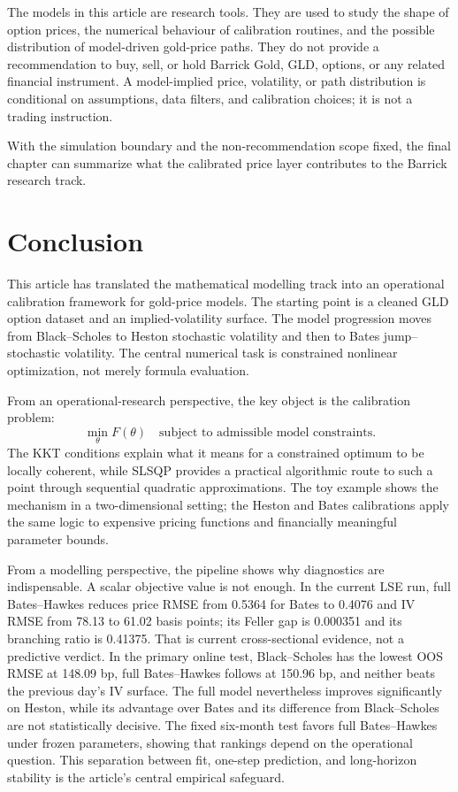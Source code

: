 \documentclass[a4paper,10pt,titlepage,oneside,openany]{book}
\theoremstyle{plain}
\theoremstyle{definition}
\theoremstyle{remark}
\begin{document}
The models in this article are research tools. They are used to study the shape of option prices, the numerical behaviour of calibration routines, and the possible distribution of model-driven gold-price paths. They do not provide a recommendation to buy, sell, or hold Barrick Gold, GLD, options, or any related financial instrument. A model-implied price, volatility, or path distribution is conditional on assumptions, data filters, and calibration choices; it is not a trading instruction.

With the simulation boundary and the non-recommendation scope fixed, the final chapter can summarize what the calibrated price layer contributes to the Barrick research track.


\chapter*{Conclusion}
{}

This article has translated the mathematical modelling track into an operational calibration framework for gold-price models. The starting point is a cleaned GLD option dataset and an implied-volatility surface. The model progression moves from Black--Scholes to Heston stochastic volatility and then to Bates jump--stochastic volatility. The central numerical task is constrained nonlinear optimization, not merely formula evaluation.

From an operational-research perspective, the key object is the calibration problem:
\[
    \min_\theta F(\theta)
    \quad\text{subject to admissible model constraints}.
\]
The KKT conditions explain what it means for a constrained optimum to be locally coherent, while SLSQP provides a practical algorithmic route to such a point through sequential quadratic approximations. The toy example shows the mechanism in a two-dimensional setting; the Heston and Bates calibrations apply the same logic to expensive pricing functions and financially meaningful parameter bounds.

From a modelling perspective, the pipeline shows why diagnostics are indispensable. A scalar objective value is not enough. In the current LSE run, full Bates--Hawkes reduces price RMSE from 0.5364 for Bates to 0.4076 and IV RMSE from 78.13 to 61.02 basis points; its Feller gap is 0.000351 and its branching ratio is 0.41375. That is current cross-sectional evidence, not a predictive verdict. In the primary online test, Black--Scholes has the lowest OOS RMSE at 148.09 bp, full Bates--Hawkes follows at 150.96 bp, and neither beats the previous day's IV surface. The full model nevertheless improves significantly on Heston, while its advantage over Bates and its difference from Black--Scholes are not statistically decisive. The fixed six-month test favors full Bates--Hawkes under frozen parameters, showing that rankings depend on the operational question. This separation between fit, one-step prediction, and long-horizon stability is the article's central empirical safeguard.
\end{document}
